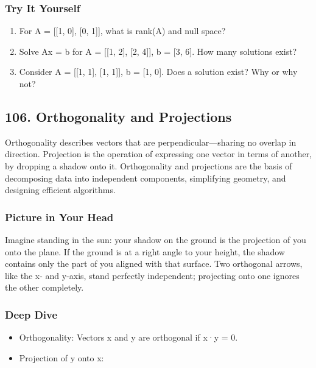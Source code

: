 \documentclass[
  letterpaper,
  DIV=11,
  numbers=noendperiod]{scrreprt}
\providecommand{\tightlist}{%
  \setlength{\itemsep}{0pt}\setlength{\parskip}{0pt}}
\begin{document}
\subsubsection{Try It Yourself}\label{try-it-yourself-104}

\begin{enumerate}
\def\labelenumi{\arabic{enumi}.}
\tightlist
\item
  For A = {[}{[}1, 0{]}, {[}0, 1{]}{]}, what is rank(A) and null space?
\item
  Solve Ax = b for A = {[}{[}1, 2{]}, {[}2, 4{]}{]}, b = {[}3, 6{]}. How
  many solutions exist?
\item
  Consider A = {[}{[}1, 1{]}, {[}1, 1{]}{]}, b = {[}1, 0{]}. Does a
  solution exist? Why or why not?
\end{enumerate}

\subsection{106. Orthogonality and
Projections}\label{orthogonality-and-projections}

Orthogonality describes vectors that are perpendicular---sharing no
overlap in direction. Projection is the operation of expressing one
vector in terms of another, by dropping a shadow onto it. Orthogonality
and projections are the basis of decomposing data into independent
components, simplifying geometry, and designing efficient algorithms.

\subsubsection{Picture in Your Head}\label{picture-in-your-head-105}

Imagine standing in the sun: your shadow on the ground is the projection
of you onto the plane. If the ground is at a right angle to your height,
the shadow contains only the part of you aligned with that surface. Two
orthogonal arrows, like the x- and y-axis, stand perfectly independent;
projecting onto one ignores the other completely.

\subsubsection{Deep Dive}\label{deep-dive-105}

\begin{itemize}
\tightlist
\item
  Orthogonality: Vectors x and y are orthogonal if x·y = 0.
\item
  Projection of y onto x:
\end{itemize}
\end{document}
